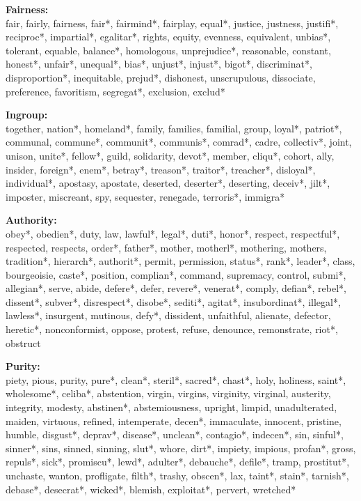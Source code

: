 \documentclass[12pt]{article}
\begin{document}
\textbf{Fairness:}\\
fair, fairly, fairness, fair*, fairmind*, fairplay, equal*, justice, justness, justifi*, reciproc*, impartial*, egalitar*, rights, equity, evenness, equivalent, unbias*, tolerant, equable, balance*, homologous, unprejudice*, reasonable, constant, honest*, unfair*, unequal*, bias*, unjust*, injust*, bigot*, discriminat*, disproportion*, inequitable, prejud*, dishonest, unscrupulous, dissociate, preference, favoritism, segregat*, exclusion, exclud*
\vspace{.5cm}

\textbf{Ingroup:}\\
together, nation*, homeland*, family, families, familial, group, loyal*, patriot*, communal, commune*, communit*, communis*, comrad*, cadre, collectiv*, joint, unison, unite*, fellow*, guild, solidarity, devot*, member, cliqu*, cohort, ally, insider, foreign*, enem*, betray*, treason*, traitor*, treacher*, disloyal*, individual*, apostasy, apostate, deserted, deserter*, deserting, deceiv*, jilt*, imposter, miscreant, spy, sequester, renegade, terroris*, immigra*
\vspace{.5cm}

\textbf{Authority:}\\
obey*, obedien*, duty, law, lawful*, legal*, duti*, honor*, respect, respectful*, respected, respects, order*, father*, mother, motherl*, mothering, mothers, tradition*, hierarch*, authorit*, permit, permission, status*, rank*, leader*, class, bourgeoisie, caste*, position, complian*, command, supremacy, control, submi*, allegian*, serve, abide, defere*, defer, revere*, venerat*, comply, defian*, rebel*, dissent*, subver*, disrespect*, disobe*, sediti*, agitat*, insubordinat*, illegal*, lawless*, insurgent, mutinous, defy*, dissident, unfaithful, alienate, defector, heretic*, nonconformist, oppose, protest, refuse, denounce, remonstrate, riot*, obstruct
\vspace{.5cm}

\textbf{Purity:}\\
piety, pious, purity, pure*, clean*, steril*, sacred*, chast*, holy, holiness, saint*, wholesome*, celiba*, abstention, virgin, virgins, virginity, virginal, austerity, integrity, modesty, abstinen*, abstemiousness, upright, limpid, unadulterated, maiden, virtuous, refined, intemperate, decen*, immaculate, innocent, pristine, humble, disgust*, deprav*, disease*, unclean*, contagio*, indecen*, sin, sinful*, sinner*, sins, sinned, sinning, slut*, whore, dirt*, impiety, impious, profan*, gross, repuls*, sick*, promiscu*, lewd*, adulter*, debauche*, defile*, tramp, prostitut*, unchaste, wanton, profligate, filth*, trashy, obscen*, lax, taint*, stain*, tarnish*, debase*, desecrat*, wicked*, blemish, exploitat*, pervert, wretched*
\end{document}
